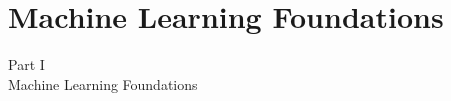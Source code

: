 \documentclass[aspectratio=169,11pt]{beamer}
\begin{document}

\section{Machine Learning Foundations}

\begin{frame}{}
\begin{center}
{\Huge \textcolor{uzhblue}{Part I}}\\[0.8em]
{\LARGE Machine Learning Foundations}
\end{center}
\end{frame}
\end{document}
